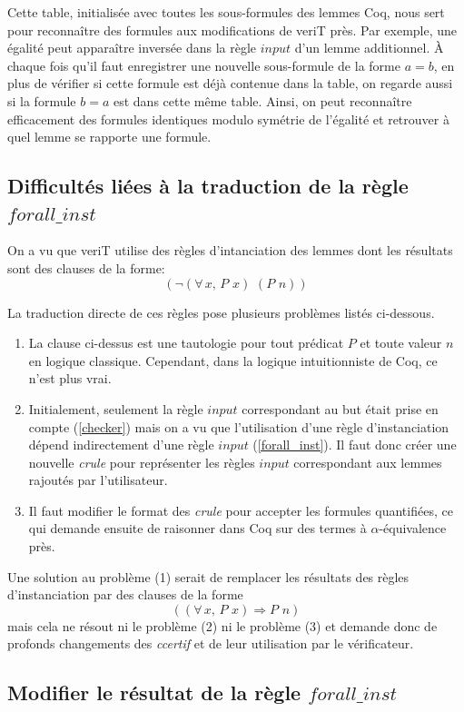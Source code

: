 \documentclass[11pt]{article}
\begin{document}
Cette table, initialisée avec toutes les sous-formules des lemmes Coq, nous sert pour reconnaître des formules aux modifications de veriT près. Par exemple, une égalité  peut apparaître inversée  dans la règle $input$ d'un lemme additionnel. À chaque fois qu'il faut enregistrer une nouvelle sous-formule de la forme $a = b$, en plus de vérifier si cette formule est déjà contenue dans la table, on regarde aussi si la formule $b = a$ est dans cette même table. Ainsi, on peut reconnaître efficacement des formules identiques modulo symétrie de l'égalité et retrouver à quel lemme se rapporte une formule.

\subsection{Difficultés liées à la traduction de la règle $forall\_inst$}
On a vu que veriT utilise des règles d'intanciation des lemmes dont les résultats sont des clauses de la forme: 
\[  (\neg (\forall \, x, \, P \,\, x) \,\, (P \,\, n)) \]

La traduction directe de ces règles pose plusieurs problèmes listés ci-dessous. 
\begin{enumerate}
\item La clause ci-dessus est une tautologie pour tout prédicat $P$ et toute valeur $n$ en logique classique. Cependant, dans la logique intuitionniste de Coq, ce n'est plus vrai. 
\item Initialement, seulement la règle $input$ correspondant au but était prise en compte (\ref{checker}) mais on a vu que l'utilisation d'une règle d'instanciation dépend indirectement d'une règle $input$ (\ref{forall_inst}). Il faut donc créer une nouvelle \textit{crule} pour représenter les règles $input$ correspondant aux lemmes rajoutés par l'utilisateur.
\item Il faut modifier le format des \textit{crule} pour accepter les formules quantifiées, ce qui demande ensuite de raisonner dans Coq sur des termes à $\alpha$-équivalence près.
\end{enumerate}
Une solution au problème (1) serait de remplacer les résultats des règles d'instanciation par des clauses de la forme
\[   ((\forall \, x, \, P\,\, x) \Rightarrow P \,\, n) \]
mais cela ne résout ni le problème (2) ni le problème (3) et demande donc de profonds changements des \textit{ccertif} et de leur utilisation par le vérificateur.


\subsection{Modifier le résultat de la règle $forall\_inst$} \label{processing_forallinst}
\end{document}
